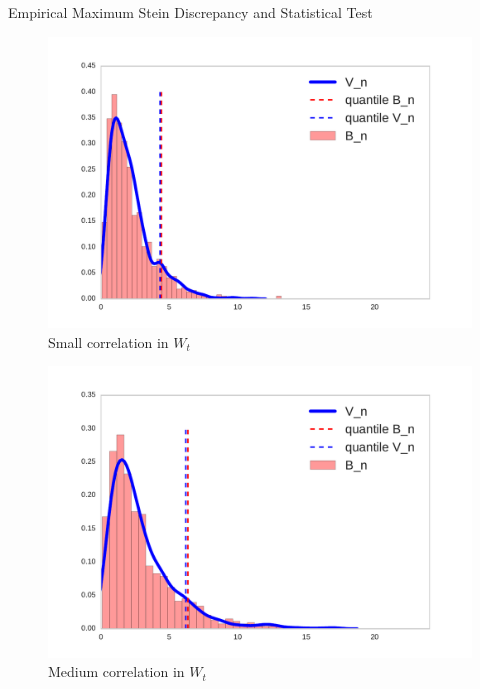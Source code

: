 \begin{frame}
\begin{columns}
\begin{column}{.33\linewidth}
\begin{block}{Empirical Maximum Stein Discrepancy and Statistical Test}
\begin{center}
  \begin{minipage}{.49\linewidth}
\begin{figure}
 \includegraphics[width=\textwidth]{../../presentation/img/bootstrapWorks1.pdf}
 \caption{Small correlation in $W_t$} 
\end{figure}
 \end{minipage}
  \begin{minipage}{.49\linewidth}
\begin{figure}
 \includegraphics[width=\textwidth]{../../presentation/img/bootstrapWorks4.pdf}
 \caption{Medium correlation in $W_t$} 
\end{figure}
  \end{minipage}
\end{center}





\end{block}
\end{column}
\end{columns}
\end{frame}
